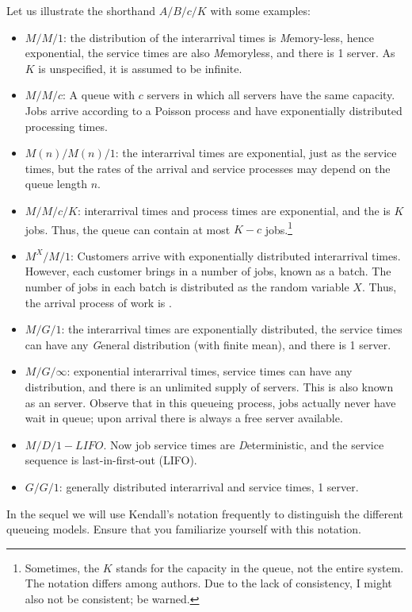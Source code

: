 Let us illustrate the shorthand $A/B/c/K$ with some examples:
\begin{itemize}
\item $M/M/1$: the distribution of the interarrival times is
  \emph{M}emory-less, hence exponential, the service times are also
  \emph{M}emoryless, and there is 1 server. As $K$ is unspecified, it
  is assumed to be infinite.
\item $M/M/c$: A  queue with $c$ servers in which
  all servers have the same capacity. Jobs arrive according to a
  Poisson process and have exponentially distributed processing times.
\item $M(n)/M(n)/1$: the interarrival times are exponential, just as
  the service times, but the rates of the arrival and service processes
  may depend on the queue length $n$. 
\item $M/M/c/K$: interarrival times and process times are exponential,
  and the  is $K$ jobs. Thus, the queue can
  contain at most $K-c$ jobs.\footnote{Sometimes, the $K$ stands for
    the capacity in the queue, not the entire system. The notation differs among
    authors. Due to the lack of consistency, I might also not be
    consistent; be warned.}
\item $M^X/M/1$: Customers arrive with exponentially distributed
  interarrival times. However, each customer brings in a number of
  jobs, known as a batch. The number of jobs in each batch is
  distributed as the random variable $X$. Thus, the arrival process of
  work is .
\item $M/G/1$: the interarrival times are exponentially distributed,
  the service times can have any \emph{G}eneral distribution (with
  finite mean), and there is 1 server.
\item $M/G/\infty$: exponential interarrival times, service times can
  have any distribution, and there is an unlimited supply of
  servers. This is also known as an  server. Observe
  that in this queueing process, jobs actually never have wait in
  queue; upon arrival there is always a free server available.
\item $M/D/1-LIFO$.  Now job service times are \emph{D}eterministic, and the service sequence is last-in-first-out (LIFO).
\item $G/G/1$: generally distributed interarrival and service times, 1 server.
\end{itemize}

In the sequel we will use Kendall's notation frequently to distinguish
the different queueing models. Ensure that you familiarize yourself
with this notation.

